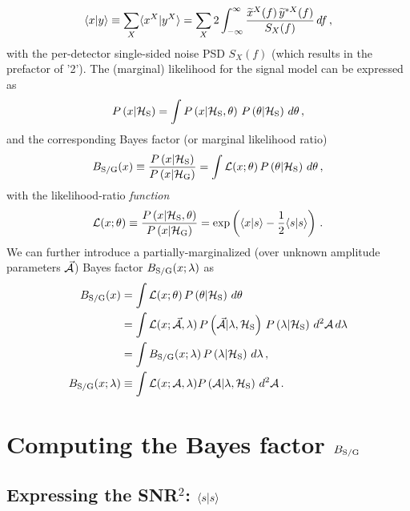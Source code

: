\documentclass[aps,prd,onecolumn,notitlepage,nofootinbib,superscriptaddress,altaffilletter,floatfix]{revtex4-1}
\begin{document}
\begin{equation}
  \label{eq:5}
  \langle x|y\rangle\equiv \sum_{X} \langle x^X|y^X\rangle = \sum_X 2\int_{-\infty}^{\infty} \frac{\widetilde{x}^X(f)\,\widetilde{y}^{*X}(f)}{S_X(f)}\,df\,,
\end{equation}
with the per-detector single-sided noise PSD $S_X(f)$ (which results in the prefactor of '2').
The (marginal) likelihood for the signal model can be expressed as
\begin{equation}
  \label{eq:6}
  P\left(x|\mathcal{H}_{\mathrm{S}}\right) = \int P\left(x|\mathcal{H}_{\mathrm{S}},\theta\right)\,P\left(\theta|\mathcal{H}_{\mathrm{S}}\right)\,d\theta\,,
\end{equation}
and the corresponding Bayes factor (or marginal likelihood ratio)
\begin{equation}
  \label{eq:7}
  B_{\mathrm{S/G}}(x) \equiv \frac{P\left(x|\mathcal{H}_{\mathrm{S}}\right)}{P\left(x|\mathcal{H}_{\mathrm{G}}\right)} = \int \mathcal{L}(x;\theta)\,P\left(\theta|\mathcal{H}_{\mathrm{S}}\right)\,d\theta\,,
\end{equation}
with the likelihood-ratio \emph{function}
\begin{equation}
  \label{eq:8}
  \mathcal{L}(x;\theta) \equiv \frac{P\left(x|\mathcal{H}_{\mathrm{S}},\theta\right)}{P\left(x|\mathcal{H}_{\mathrm{G}}\right)} = \exp\left(\langle x|s\rangle - \frac{1}{2}\langle s|s\rangle\right)\,.
\end{equation}
We can further introduce a partially-marginalized (over unknown amplitude parameters $\vec{\mathcal{A}}$) Bayes factor $B_{\mathrm{S/G}}(x;\lambda)$ as
\begin{align}
  B_{\mathrm{S/G}}(x) &= \int \mathcal{L}(x;\theta)\,P\left(\theta|\mathcal{H}_{\mathrm{S}}\right)\,d\theta \notag\\
          &= \int \mathcal{L}(x;\vec{\mathcal{A}},\lambda)\,P\left(\vec{\mathcal{A}}|\lambda,\mathcal{H}_{\mathrm{S}}\right)\,P\left(\lambda|\mathcal{H}_{\mathrm{S}}\right)\,d^2\mathcal{A}\,d\lambda \notag\\
          &= \int B_{\mathrm{S/G}}(x;\lambda) \,P\left(\lambda|\mathcal{H}_{\mathrm{S}}\right)\,d\lambda\,,   \label{eq:23a}\\
  B_{\mathrm{S/G}}(x;\lambda) &\equiv \int \mathcal{L}(x;\mathcal{A},\lambda)P\left(\mathcal{A}|\lambda,\mathcal{H}_{\mathrm{S}}\right)\,d^2\mathcal{A}\,.  \label{eq:23b}
\end{align}

\section{Computing the Bayes factor $B_{\mathrm{S/G}}$}
\label{sec:comp-bayes-fact}

\subsection{Expressing the SNR$^2$: $\langle s|s\rangle$}
\label{sec:computing-scalarss}
\end{document}
